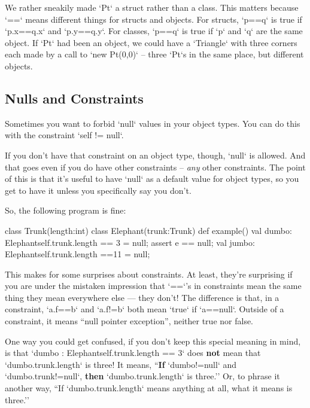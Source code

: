 \begin{finepoint}
We rather sneakily made \xcd`Pt` a struct rather than a class.   This matters
because \xcd`==` means different things for structs and objects.  For structs,
\xcd`p==q` is true if \xcd`p.x==q.x` and \xcd`p.y==q.y`.  For classes,
\xcd`p==q` is true if \xcd`p` and \xcd`q` are the same object.  
If \xcd`Pt` had been an object, we could have a \xcd`Triangle` with three
corners each made by a call to \xcd`new Pt(0,0)` -- three \xcd`Pt`s in the
same place, but different objects.
\end{finepoint}


\subsection{Nulls and Constraints}

Sometimes you want to forbid \xcd`null` values in your object types.  You can
do this with the constraint \xcd`{self != null}`.

If you don't have that constraint on an object type, though, \xcd`null` is
allowed. And that goes even if you do have other constraints -- {\em any}
other constraints. The point of this is that it's useful to have \xcd`null` as
a default value for object types, so you get to have it unless you
specifically say you don't. 

So, the following program is fine: 
\begin{xtennum}[]
 class Trunk(length:int){}
 class Elephant(trunk:Trunk){}
 def example() {
  val dumbo: Elephant{self.trunk.length == 3} = null;
  assert e == null;
  val jumbo: Elephant{self.trunk.length ==11} = null;
}
\end{xtennum}

This makes for some surprises about constraints. At least, they're surprising
if you are under the mistaken impression that \xcd`==`'s in constraints mean
the same thing they mean everywhere else --- they don't! The difference is
that, in a constraint, \xcd`a.f==b` and \xcd`a.f!=b` both mean \xcd`true` if
\xcd`a==null`. Outside of a constraint, it means ``null pointer exception'',
neither true nor false.

One way you could get confused, if you don't keep this special meaning in
mind, is that \xcd`dumbo : Elephant{self.trunk.length == 3}` does {\bf not}
mean that \xcd`dumbo.trunk.length` is three!  It means, ``{\bf If}
\xcd`dumbo!=null` and \xcd`dumbo.trunk!=null`, {\bf then}
\xcd`dumbo.trunk.length` is three.''  Or, to phrase it another way, ``If
\xcd`dumbo.trunk.length` means anything at all, what it means is three.''

